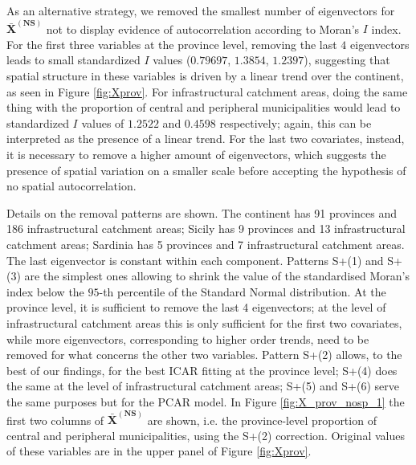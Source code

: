 \documentclass[openany]{book}
\begin{document}
As an alternative strategy, we removed the smallest number of eigenvectors for $\mathbf{\bar{X}^{(NS)}}$ not to display evidence of autocorrelation according to Moran's $I$ index. %
For the first three variables at the province level, removing the last $4$ eigenvectors leads to small standardized $I$ values ($0.79697$, $1.3854$, $1.2397$), suggesting that spatial structure in these variables is driven by a linear trend over the continent, as seen in Figure \ref{fig:Xprov}. For infrastructural catchment areas, doing the same thing with the proportion of central and peripheral municipalities would lead to standardized $I$ values of $1.2522$ and $0.4598$ respectively; again, this can be interpreted as the presence of a linear trend. For the last two covariates, instead, it is necessary to remove a higher amount of eigenvectors, which suggests the presence of spatial variation on a smaller scale before accepting the hypothesis of no spatial autocorrelation.

Details on the removal patterns are shown. The continent has 91 provinces and 186 infrastructural catchment areas; Sicily has 9 provinces and 13 infrastructural catchment areas; Sardinia has 5 provinces and 7 infrastructural catchment areas. The last eigenvector is constant within each component.
Patterns S+(1) and S+(3) are the simplest ones allowing to shrink the value of the standardised Moran's index below the $95$-th percentile of the Standard Normal distribution. At the province level, it is sufficient to remove the last 4 eigenvectors; at the level of infrastructural catchment areas this is only sufficient for the first two covariates, while more eigenvectors, corresponding to higher order trends, need to be removed for what concerns the other two variables. Pattern S+(2) allows, to the best of our findings, for the best ICAR fitting at the province level; S+(4) does the same at the level of infrastructural catchment areas; S+(5) and S+(6) serve the same purposes but for the PCAR model. In Figure \ref{fig:X_prov_nosp_1} the first two columns of $\mathbf{\bar{X}^{(NS)}}$ are shown, i.e. the province-level proportion of central and peripheral municipalities, using the S+(2) correction. Original values of these variables are in the upper panel of Figure \ref{fig:Xprov}.
\end{document}
